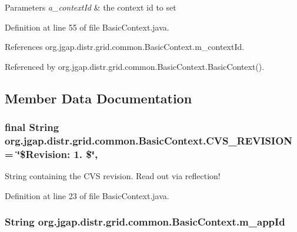 \begin{DoxyParams}{Parameters}
{\em a\-\_\-context\-Id} & the context id to set \\
\hline
\end{DoxyParams}


Definition at line 55 of file Basic\-Context.\-java.



References org.\-jgap.\-distr.\-grid.\-common.\-Basic\-Context.\-m\-\_\-context\-Id.



Referenced by org.\-jgap.\-distr.\-grid.\-common.\-Basic\-Context.\-Basic\-Context().



\subsection{Member Data Documentation}
\hypertarget{classorg_1_1jgap_1_1distr_1_1grid_1_1common_1_1_basic_context_ad0efe7cb452822b126d6d19649d009e2}{
\subsubsection[{C\-V\-S\-\_\-\-R\-E\-V\-I\-S\-I\-O\-N}]{\setlength{\rightskip}{0pt plus 5cm}final String org.\-jgap.\-distr.\-grid.\-common.\-Basic\-Context.\-C\-V\-S\-\_\-\-R\-E\-V\-I\-S\-I\-O\-N = \char`\"{}\$Revision\-: 1. \$\char`\"{}\hspace{0.3cm}{\ttfamily [static]}, {\ttfamily [private]}}}\label{classorg_1_1jgap_1_1distr_1_1grid_1_1common_1_1_basic_context_ad0efe7cb452822b126d6d19649d009e2}
String containing the C\-V\-S revision. Read out via reflection! 

Definition at line 23 of file Basic\-Context.\-java.

\hypertarget{classorg_1_1jgap_1_1distr_1_1grid_1_1common_1_1_basic_context_afc60459b792c5b97dded9b688dfe5ed0}{
\subsubsection[{m\-\_\-app\-Id}]{\setlength{\rightskip}{0pt plus 5cm}String org.\-jgap.\-distr.\-grid.\-common.\-Basic\-Context.\-m\-\_\-app\-Id\hspace{0.3cm}{\ttfamily [private]}}}\label{classorg_1_1jgap_1_1distr_1_1grid_1_1common_1_1_basic_context_afc60459b792c5b97dded9b688dfe5ed0}


